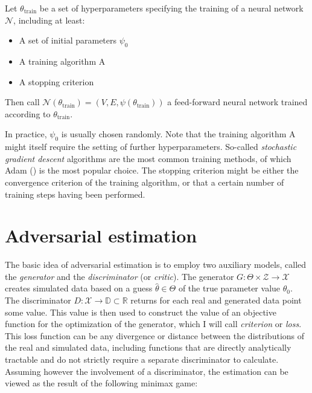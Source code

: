 \begin{definition}
    Let $\theta_{\textrm{train}}$ be a set of hyperparameters specifying the training of a neural network $\mathcal{N}$, including at least:
    \begin{itemize}
        \item A set of initial parameters $\psi_0$
        \item A training algorithm A
        \item A stopping criterion
    \end{itemize}
    Then call  $\mathcal{N}(\theta_{\text{train}}) = (V, E, \psi(\theta_{\text{train}}))$ a feed-forward neural network trained according to $\theta_{\textrm{train}}$.
\end{definition}

In practice, $\psi_0$ is usually chosen randomly.
Note that the training algorithm A might itself require the setting of further hyperparameters.
So-called \textit{stochastic gradient descent} algorithms are the most common training methods, of which Adam (\cite{diederik2014adam}) is the most popular choice. %
The stopping criterion might be either the convergence criterion of the training algorithm, or that a certain number of training steps having been performed.

\section{Adversarial estimation}
\label{sec:adversarial_estimation}

The basic idea of adversarial estimation is to employ two auxiliary models, called the \textit{generator} and the \textit{discriminator} (or \textit{critic}).
The generator $G : \Theta \times \mathcal{Z} \rightarrow \mathcal{X}$ creates simulated data based on a guess $\hat{\theta} \in \Theta$ of the true parameter value $\theta_0$.
The discriminator $D : \mathcal{X} \rightarrow  \mathbb{D} \subset \mathbb{R}$ returns for each real and generated data point some value.
This value is then used to construct the value of an objective function for the optimization of the generator, which I will call \textit{criterion} or \textit{loss}.
This loss function can be any divergence or distance between the distributions of the real and simulated data, including functions that are directly analytically tractable and do not strictly require a separate discriminator to calculate. %
Assuming however the involvement of a discriminator, the estimation can be viewed as the result of the following minimax game:

